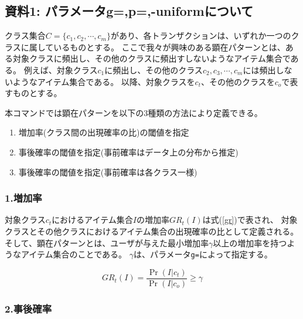 \subsection{資料1: パラメータg=,p=,-uniformについて\label{sect:ep}}
クラス集合$C=\{c_1,c_2,\cdots,c_m\}$があり、各トランザクションは、いずれか一つのクラスに属しているものとする。
ここで我々が興味のある顕在パターンとは、ある対象クラスに頻出し、その他のクラスに頻出すしないようなアイテム集合である。
例えば、対象クラス$c_1$に頻出し、その他のクラス$c_2,c_3,\cdots,c_m$には頻出しないようなアイテム集合である。
以降、対象クラスを$c_t$、その他のクラスを$c_o$で表すものとする。

本コマンドでは顕在パターンを以下の3種類の方法により定義できる。
\begin{enumerate}
\item 増加率(クラス間の出現確率の比)の閾値を指定
\item 事後確率の閾値を指定(事前確率はデータ上の分布から推定)
\item 事後確率の閾値を指定(事前確率は各クラス一様)
\end{enumerate}

\subsubsection*{1.増加率}

対象クラス$c_t$におけるアイテム集合$I$の増加率$GR_t(I)$は式(\ref{gr})で表され、
対象クラスとその他クラスにおけるアイテム集合の出現確率の比として定義される。
そして、顕在パターンとは、ユーザが与えた最小増加率$\gamma$以上の増加率を持つようなアイテム集合のことである。
$\gamma$は、パラメータ\verb|g=|によって指定する。

\begin{equation}
GR_t(I)=\frac{\Pr(I|c_t)}{\Pr(I|c_o)} \ge \gamma \label{gr}
\end{equation}

\subsubsection*{2.事後確率}


